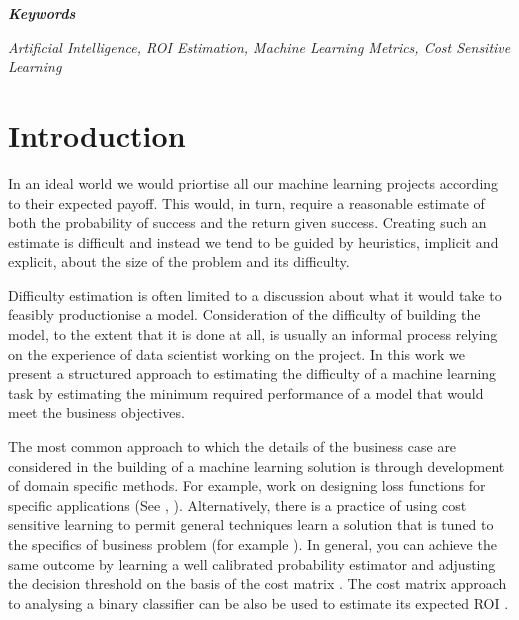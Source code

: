 \documentclass[11pt,a4paper]{article}
\begin{document}
{ \fontsize{14pt}{1em}\selectfont \textbf{\textit{Keywords}} } \par \vspace*{6pt minus \parskip}
{ \fontsize{10pt}{1em}\selectfont \textsl{Artificial Intelligence, ROI Estimation, Machine Learning Metrics, Cost Sensitive Learning} }\par \vspace*{18pt minus \parskip}
%
%
\section{Introduction}
%
\titlespacing*{\section}{0pt}{8pt}{6pt}
%
In an ideal world we would priortise all our machine learning projects according to their expected payoff.
This would, in turn, require a reasonable estimate of both the probability of success and the return given
success. Creating such an estimate is difficult and instead we tend to be guided by heuristics,
implicit and explicit, about the size of the problem and its difficulty.

Difficulty estimation is often limited to a discussion about what
it would take to feasibly productionise a model.
Consideration of the difficulty of building the model, to the extent that it is done at all, is usually
an informal process relying on the experience of data scientist working on the project.
In this work we present a structured approach to estimating the difficulty of a machine learning
task by estimating the minimum required performance of a model that would meet the business objectives.

The most common approach to which the details of the business case are considered in the building of a machine
learning solution is through development of domain specific methods. For example, work on designing
loss functions for specific applications (See \cite{Johnson19}, \cite{Hennig2007}). Alternatively, there is a
practice of using cost sensitive learning \cite{Domingos1999,Margineantu2000,Elkan2001,Tian+Zhang2019}
to permit general techniques learn a solution that is tuned to the
specifics of business problem (for example \cite{Fatlawi2017}). In general, you can achieve
the same outcome by learning a well calibrated probability estimator and adjusting the decision threshold
on the basis of the cost matrix \cite{Nikolaou2016}.
The cost matrix approach to analysing a binary classifier can be also be used to estimate its expected ROI \cite{Ylijoki2018}.
\end{document}
